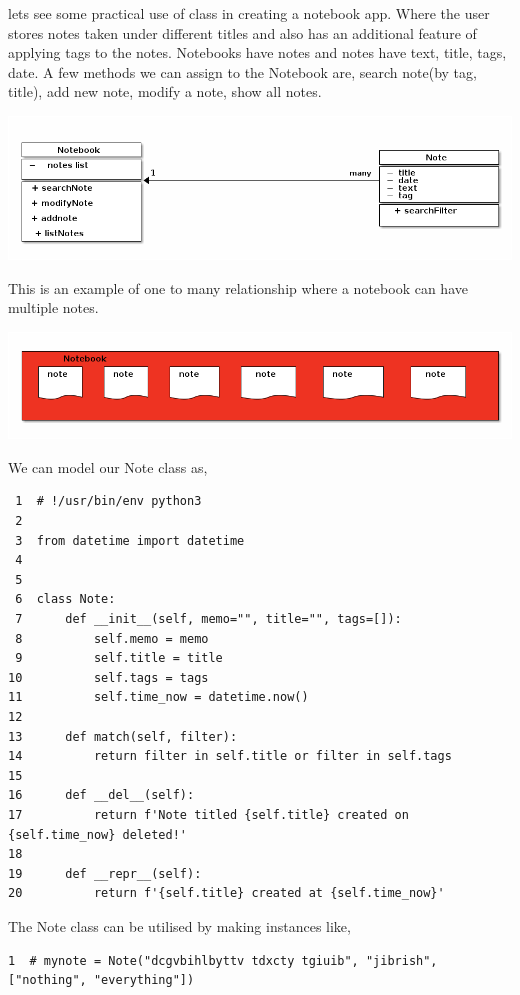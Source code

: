 \documentclass[11pt]{article}
\begin{document}
lets see some practical use of class in creating a notebook app. Where the user stores notes taken under different titles and also has an additional feature of applying tags to the notes. Notebooks have notes and notes have text, title, tags, date. A few methods we can assign to the Notebook are, search note(by tag, title), add new note, modify a note, show all notes.

\begin{center}
\includegraphics[width=.9\linewidth]{./img/notes.png}
\end{center}


This is an example of one to many relationship where a notebook can have multiple notes.

\begin{center}
\includegraphics[width=.9\linewidth]{./img/noteToNotesRelation.png}
\end{center}


We can model our Note class as,

\begin{verbatim}
 1  # !/usr/bin/env python3
 2  
 3  from datetime import datetime
 4  
 5  
 6  class Note:
 7      def __init__(self, memo="", title="", tags=[]):
 8          self.memo = memo
 9          self.title = title
10          self.tags = tags
11          self.time_now = datetime.now()
12  
13      def match(self, filter):
14          return filter in self.title or filter in self.tags
15  
16      def __del__(self):
17          return f'Note titled {self.title} created on {self.time_now} deleted!'
18  
19      def __repr__(self):
20          return f'{self.title} created at {self.time_now}'
\end{verbatim}

The Note class can be utilised by making instances like, 

\begin{verbatim}
1  # mynote = Note("dcgvbihlbyttv tdxcty tgiuib", "jibrish", ["nothing", "everything"])
\end{verbatim}
\end{document}
